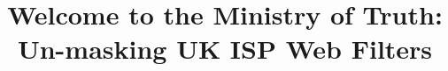 \documentclass{bmcart}
\begin{document}
\begin{frontmatter}

\begin{fmbox}


\title{Welcome to the Ministry of Truth: Un-masking UK ISP Web Filters}


\author[
   addressref={lancs},                   %
   corref={lancs},                       %
   email={m.rowe@lancaster.ac.uk}   %
]{ }



\address[id=lancs]{%
  , %
  ,                     %
  ,                              %
}



\end{fmbox}
\end{frontmatter}
\end{document}
